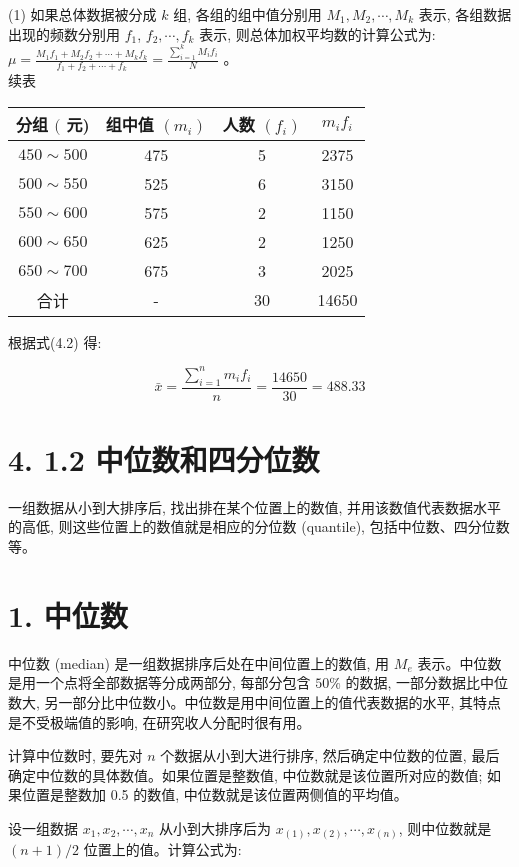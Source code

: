 \documentclass[10pt]{article}
\begin{document}
\begin{CJK*}{UTF8}{bsmi}
(1) 如果总体数据被分成 $k$ 组, 各组的组中值分别用 $M_{1}, M_{2}, \cdots, M_{k}$ 表示, 各组数据出现的频数分别用 $f_{1}$, $f_{2}, \cdots, f_{k}$ 表示, 则总体加权平均数的计算公式为: $\mu=\frac{M_{1} f_{1}+M_{2} f_{2}+\cdots+M_{k} f_{k}}{f_{1}+f_{2}+\cdots+f_{k}}=\frac{\sum_{i=1}^{k} M_{i} f_{i}}{N}$ 。\\
续表

\begin{center}
\begin{tabular}{cccc}
\hline
分组 $($ 元) & 组中值 $\left(m_{i}\right)$ & 人数 $\left(f_{i}\right)$ & $m_{i} f_{i}$ \\
\hline
$450 \sim 500$ & 475 & 5 & 2375 \\
$500 \sim 550$ & 525 & 6 & 3150 \\
$550 \sim 600$ & 575 & 2 & 1150 \\
$600 \sim 650$ & 625 & 2 & 1250 \\
$650 \sim 700$ & 675 & 3 & 2025 \\
\hline
合计 & - & 30 & 14650 \\
\hline
\end{tabular}
\end{center}

根据式(4.2) 得:

$$
\bar{x}=\frac{\sum_{i=1}^{n} m_{i} f_{i}}{n}=\frac{14650}{30}=488.33
$$

\section*{4. 1.2 中位数和四分位数}
一组数据从小到大排序后, 找出排在某个位置上的数值, 并用该数值代表数据水平的高低, 则这些位置上的数值就是相应的分位数 (quantile), 包括中位数、四分位数等。

\section*{1. 中位数}
中位数 (median) 是一组数据排序后处在中间位置上的数值, 用 $M_{e}$ 表示。中位数是用一个点将全部数据等分成两部分, 每部分包含 $50 \%$ 的数据, 一部分数据比中位数大, 另一部分比中位数小。中位数是用中间位置上的值代表数据的水平, 其特点是不受极端值的影响, 在研究收人分配时很有用。

计算中位数时, 要先对 $n$ 个数据从小到大进行排序, 然后确定中位数的位置, 最后确定中位数的具体数值。如果位置是整数值, 中位数就是该位置所对应的数值; 如果位置是整数加 0.5 的数值, 中位数就是该位置两侧值的平均值。

设一组数据 $x_{1}, x_{2}, \cdots, x_{n}$ 从小到大排序后为 $x_{(1)}, x_{(2)}, \cdots, x_{(n)}$, 则中位数就是 $(n+1) / 2$ 位置上的值。计算公式为:


\end{CJK*}
\end{document}
